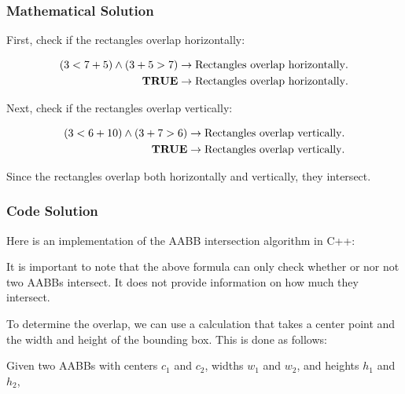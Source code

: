\subsubsection{Mathematical Solution}
First, check if the rectangles overlap horizontally:

\begin{equation*}
    \begin{aligned}
        (3 < 7 + 5) \land (3 + 5 > 7) & \rightarrow \text{Rectangles overlap horizontally}. \\
        \textnormal{\textbf{TRUE}}    & \rightarrow \text{Rectangles overlap horizontally}.
    \end{aligned}
\end{equation*}

Next, check if the rectangles overlap vertically:

\begin{equation*}
    \begin{aligned}
        (3 < 6 + 10) \land (3 + 7 > 6) & \rightarrow \text{Rectangles overlap vertically}. \\
        \textnormal{\textbf{TRUE}}     & \rightarrow \text{Rectangles overlap vertically}.
    \end{aligned}
\end{equation*}

Since the rectangles overlap both horizontally and vertically, they intersect.

\subsubsection{Code Solution}

Here is an implementation of the AABB intersection algorithm in C++:

\begin{mdframed}[linecolor=black!30!white,linewidth=.5pt,extratopheight=1em]
    
\end{mdframed}

It is important to note that the above formula can only check whether or nor
not two AABBs intersect. It does not provide information on how much they
intersect.

To determine the overlap, we can use a calculation that takes a center point
and the width and height of the bounding box. This is done as follows:

Given two AABBs with centers $c_1$ and $c_2$, widths $w_1$ and $w_2$, and
heights $h_1$ and $h_2$,

